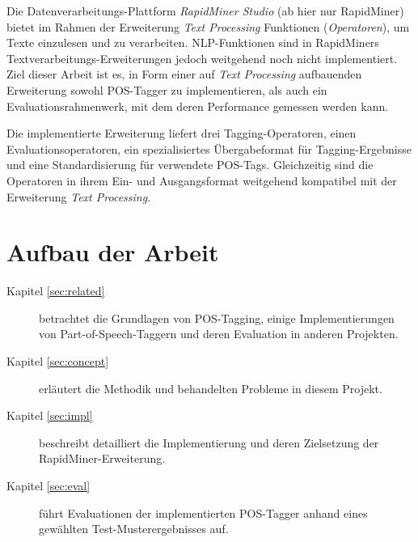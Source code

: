 Die Datenverarbeitungs-Plattform \textit{RapidMiner Studio} (ab hier nur RapidMiner) \cite{rapidminer} bietet im Rahmen der Erweiterung \textit{Text Processing} \cite{textprocessing} Funktionen (\textit{Operatoren}), um Texte einzulesen und zu verarbeiten. NLP-Funktionen sind in RapidMiners Textverarbeitungs-Erweiterungen jedoch weitgehend noch nicht implementiert. Ziel dieser Arbeit ist es, in Form einer auf \textit{Text Processing} aufbauenden Erweiterung sowohl POS-Tagger zu implementieren, als auch ein Evaluationsrahmenwerk, mit dem deren Performance gemessen werden kann.

Die implementierte Erweiterung liefert drei Tagging-Operatoren, einen Evaluationsoperatoren, ein spezialisiertes Übergabeformat für Tagging-Ergebnisse und eine Standardisierung für verwendete POS-Tags. Gleichzeitig sind die Operatoren in ihrem Ein- und Ausgangsformat weitgehend kompatibel mit der Erweiterung \textit{Text Processing}.



\section{Aufbau der Arbeit}
\label{sec:intro:structure}

\begin{description}

\item[Kapitel \ref{sec:related}] betrachtet die Grundlagen von POS-Tagging, einige Implementierungen von Part-of-Speech-Taggern und deren Evaluation in anderen Projekten.
\item[Kapitel \ref{sec:concept}] erläutert die Methodik und behandelten Probleme in diesem Projekt.
\item[Kapitel \ref{sec:impl}] beschreibt detailliert die Implementierung und deren Zielsetzung der RapidMiner-Erweiterung.
\item[Kapitel \ref{sec:eval}] führt Evaluationen der implementierten POS-Tagger anhand eines gewählten Test-Musterergebnisses auf.

\end{description}

